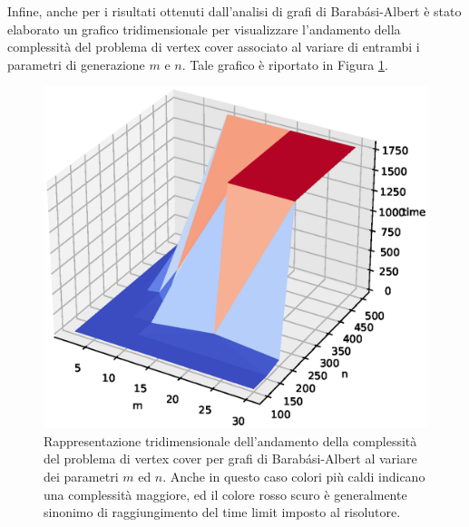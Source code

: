 Infine, anche per i risultati ottenuti dall'analisi di grafi di Barabási-Albert è stato elaborato un grafico tridimensionale per visualizzare l'andamento della complessità del problema di vertex cover associato al variare di entrambi i parametri di generazione $m$ e $n$. Tale grafico è riportato in Figura \ref{fig:bag3d}.
  \vspace{-1cm}  
\begin{figure}[h!]
     \centering
       \includegraphics[scale=0.4]{images/bag-3d.eps}
       \vspace{-0.8cm}  
       \caption{Rappresentazione tridimensionale dell'andamento della complessità del problema di vertex cover per grafi di Barabási-Albert al variare dei parametri $m$ ed $n$. Anche in questo caso colori più caldi indicano una complessità maggiore, ed il colore rosso scuro è generalmente sinonimo di raggiungimento del time limit imposto al risolutore.}      
        \label{fig:bag3d}
\end{figure}